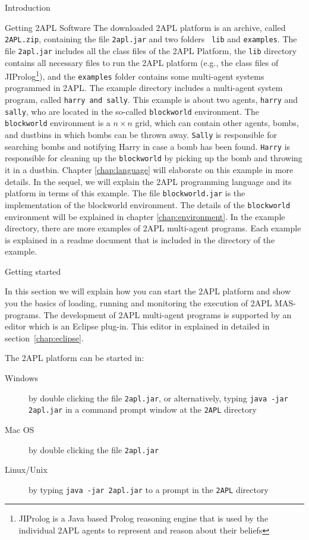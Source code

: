 \begin{chapter}{Introduction}
\begin{section}{Getting 2APL Software}
The downloaded 2APL platform is an archive, called {\tt
2APL.zip}, containing the file {\tt 2apl.jar} and two folders {\tt
lib} and {\tt examples}. The file {\tt 2apl.jar} includes all the
class files of the 2APL Platform, the {\tt lib} directory contains
all necessary files to run the 2APL platform (e.g., the class files
of JIProlog\footnote{JIProlog is a Java based Prolog reasoning
engine that is used by the individual 2APL agents to represent and
reason about their beliefs}), and the {\tt examples} folder contains
some multi-agent systems programmed in 2APL. 
The example directory
includes a multi-agent system program, called {\tt harry and sally}.
This example is about two agents, {\tt harry} and {\tt sally}, who
are located in the so-called {\tt blockworld} environment. The {\tt
blockworld} environment is a $n \times n$ grid, which can contain
other agents, bombs, and dustbins in which bombs can be thrown away.
{\tt Sally} is responsible for searching bombs and notifying Harry
in case a bomb has been found. {\tt Harry} is responsible for
cleaning up the {\tt blockworld} by picking up the bomb and throwing
it in a dustbin. Chapter \ref{chap:language} will elaborate on this
example in more details. In the sequel, we will explain the 2APL
programming language and its platform in terms of this example. The
file {\tt blockworld.jar} is the implementation of the blockworld
environment. The details of the {\tt blockworld} environment will be
explained in chapter \ref{chap:environment}. In the example
directory, there are more examples of 2APL multi-agent programs.
Each example is explained in a readme document that is included in
the directory of the example.
\end{section}

\begin{section}{Getting started}

In this section we will explain how you can start
the 2APL platform and show you the
basics of loading, running and monitoring the execution of 2APL
MAS-programs. The development of 2APL multi-agent
programs is supported by an editor which is an Eclipse plug-in. This
editor in explained in detailed in section~\ref{chap:eclipse}.

The 2APL platform can be started in:
    \begin{description}
        \item[Windows] by double clicking the file {\tt 2apl.jar}, or
            alternatively, typing {\tt java -jar 2apl.jar} in a command prompt window at
            the {\tt 2APL} directory
        \item[Mac OS] by double clicking the file {\tt 2apl.jar}
        \item[Linux/Unix] by typing {\tt java -jar 2apl.jar} to a
            prompt in the {\tt 2APL} directory
    \end{description}


\end{section}
\end{chapter}
